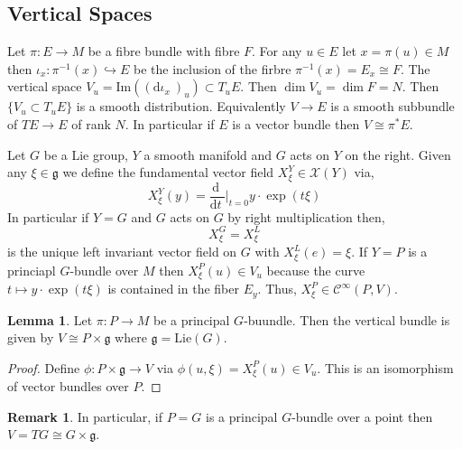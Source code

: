 \documentclass[12pt]{extarticle}
\renewcommand{\Im}[1]{\mathrm{Im}(#1)}
\renewcommand{\d}[1]{ \mathrm{d}#1 \:}
\newcommand{\deriv}[2]{\frac{\d{#1}}{\d{#2}}}
\theoremstyle{definition}
\newtheorem{lemma}[theorem]{Lemma}
\newtheorem{remark}{Remark}
\newenvironment{definition}[1][Definition:]{\begin{trivlist}
\item[\hskip \labelsep {\bfseries #1}]}{\end{trivlist}}
\newcommand{\C}[1]{\mathcal{C}^{#1}}
\begin{document}
\subsection{Vertical Spaces}

\begin{definition}
Let $\pi : E \to M$ be a fibre bundle with fibre $F$. For any $u \in E$ let $x = \pi(u) \in M$ then $\iota_x : \pi^{-1}(x) \hookrightarrow E$ be the inclusion of the firbre $\pi^{-1}(x) = E_x \cong F$. The vertical space $V_u = \Im{(\d{\iota_x})_u} \subset T_u E$. Then $\dim{V_u} = \dim{F} = N$. Then $\{ V_u \subset T_u E \}$ is a smooth distribution. Equivalently $V \to E$ is a smooth subbundle of $TE \to E$ of rank $N$. In particular if $E$ is a vector bundle then $V \cong \pi^* E$.  
\end{definition}

\newcommand{\g}{\mathfrak{g}}
\newcommand{\Lie}{\mathrm{Lie}}
\renewcommand{\C}[1]{\mathcal{C}^{#1}}

\begin{definition}
Let $G$ be a Lie group, $Y$ a smooth manifold and $G$ acts on $Y$ on the right. Given any $\xi \in \g$ we define the fundamental vector field $X^Y_\xi \in \mathscr{X}(Y)$ via,
\[ X^Y_{\xi}(y) = \deriv{}{t} \bigg|_{t = 0} y \cdot \exp(t \xi) \]
In particular if $Y = G$ and $G$ acts on $G$ by right multiplication then,
\[ X^G_{\xi} = X^L_{\xi} \]
is the unique left invariant vector field on $G$ with $X^L_\xi(e) = \xi$. If $Y = P$ is a princiapl $G$-bundle over $M$ then $X^P_\xi(u) \in V_u$ because the curve $t \mapsto y \cdot \exp(t\xi)$ is contained in the fiber $E_y$. Thus, $X^P_\xi \in \C{\infty}(P, V)$. 
\end{definition}

\begin{lemma}
Let $\pi : P \to M$ be a principal $G$-buundle. Then the vertical bundle is given by $V \cong P \times \g$ where $\g = \Lie(G)$. 
\end{lemma}

\begin{proof}
Define $\phi : P \times \g \to V$ via $\phi(u, \xi) = X^P_\xi(u) \in V_u$. This is an isomorphism of vector bundles over $P$.
\end{proof}

\begin{remark}
In particular, if $P = G$ is a principal $G$-bundle over a point then $V = TG \cong G \times \g$. 
\end{remark}

\newcommand{\Ad}{\mathrm{Ad}}
\end{document}
